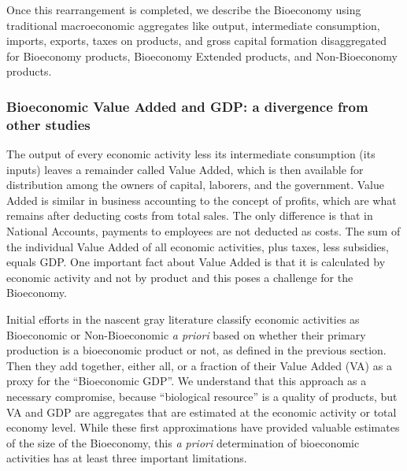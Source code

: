 \documentclass[
  letterpaper,
  DIV=11,
  numbers=noendperiod]{scrartcl}
\begin{document}
Once this rearrangement is completed, we describe the Bioeconomy using
traditional macroeconomic aggregates like output, intermediate
consumption, imports, exports, taxes on products, and gross capital
formation disaggregated for Bioeconomy products, Bioeconomy Extended
products, and Non-Bioeconomy products.

\subsubsection{Bioeconomic Value Added and GDP: a divergence from other
studies}\label{bioeconomic-value-added-and-gdp-a-divergence-from-other-studies}

The output of every economic activity less its intermediate consumption
(its inputs) leaves a remainder called Value Added, which is then
available for distribution among the owners of capital, laborers, and
the government. Value Added is similar in business accounting to the
concept of profits, which are what remains after deducting costs from
total sales. The only difference is that in National Accounts, payments
to employees are not deducted as costs. The sum of the individual Value
Added of all economic activities, plus taxes, less subsidies, equals
GDP. One important fact about Value Added is that it is calculated by
economic activity and not by product and this poses a challenge for the
Bioeconomy.

Initial efforts in the nascent gray literature classify economic
activities as Bioeconomic or Non-Bioeconomic \emph{a priori} based on
whether their primary production is a bioeconomic product or not, as
defined in the previous section. Then they add together, either all, or
a fraction of their Value Added (VA) as a proxy for the ``Bioeconomic
GDP''. We understand that this approach as a necessary compromise,
because ``biological resource'' is a quality of products, but VA and GDP
are aggregates that are estimated at the economic activity or total
economy level. While these first approximations have provided valuable
estimates of the size of the Bioeconomy, this \emph{a priori}
determination of bioeconomic activities has at least three important
limitations.
\end{document}
